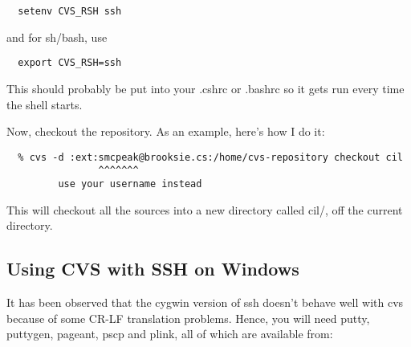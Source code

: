 \documentclass{book}
\begin{document}
\begin{verbatim}
  setenv CVS_RSH ssh
\end{verbatim}

  
and for sh/bash, use

\begin{verbatim}
  export CVS_RSH=ssh
\end{verbatim}

This should probably be put into your .cshrc or .bashrc so it gets run
every time the shell starts.

Now, checkout the repository.  As an example, here's how I do it:


\begin{verbatim}
  % cvs -d :ext:smcpeak@brooksie.cs:/home/cvs-repository checkout cil
                ^^^^^^^
         use your username instead
\end{verbatim}

This will checkout all the sources into a new directory called cil/, off
the current directory.


\subsection{Using CVS with SSH on Windows}

It has been observed that the cygwin version of ssh doesn't behave well
with cvs because of some CR-LF translation problems. Hence, you will need 
putty, puttygen, pageant, pscp and plink, all of which are available from:

\end{document}
